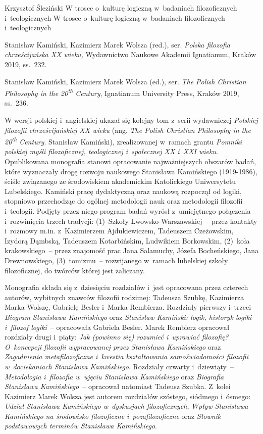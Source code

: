 \begin{recplenv}{Krzysztof Śleziński}
	{W trosce o~kulturę logiczną w~badaniach filozoficznych i~teologicznych}
	{W trosce o~kulturę logiczną w~badaniach filozoficznych\\i~teologicznych}
	{Stanisław Kamiński, Kazimierz Marek Wolsza (red.), ser. \textit{Polska filozofia chrześcijańska XX wieku,}
		Wydawnictwo Naukowe Akademii Ignatianum, Kraków 2019, ss.~232.
		
		Stanisław Kamiński, Kazimierz Marek Wolsza (ed.), ser. \textit{The Polish Christian Philosophy in the
			20\textsuperscript{th} Century}, Ignatianum University Press, Kraków 2019, ss.~236.}







W wersji polskiej i~angielskiej ukazał się kolejny tom z~serii wydawniczej \textit{Polskiej filozofii chrześcijańskiej
XX wieku} (ang. \textit{The Polish Christian Philosophy in the 20\textsuperscript{th} Century}.
Stanisław Kamiński), zrealizowanej w~ramach grantu \textit{Pomniki polskiej myśli filozoficznej,
teologicznej i~społecznej XX i~XXI wieku}. Opublikowana monografia stanowi opracowanie najważniejszych obszarów badań, które
wyznaczały drogę rozwoju naukowego Stanisława Kamińskiego (1919-1986), ściśle związanego ze środowiskiem akademickim
Katolickiego Uniwersytetu Lubelskiego. Kamiński pracę dydaktyczną oraz naukową rozpoczął od logiki, stopniowo
przechodząc do ogólnej metodologii nauk oraz metodologii filozofii i~teologii. Podjęty przez niego program badań wyrósł
z~umiejętnego połączenia i~rozwinięcia trzech tradycji: (1)~Szkoły Lwowsko-Warszawskiej~-- przez kontakty i~rozmowy
m.in. z~Kazimierzem Ajdukiewiczem, Tadeuszem Czeżowskim, Izydorą Dąmbską, Tadeuszem Kotarbińskim, Ludwikiem Borkowskim,
(2)~koła krakowskiego~-- przez znajomość prac Jana Salamuchy, Józefa Bocheńskiego, Jana Drewnowskiego,
(3)~tomizmu~-- rozwijanego w~ramach lubelskiej szkoły filozoficznej, do twórców której jest zaliczany.

Monografia składa się z~dziesięciu rozdziałów i~jest opracowana przez czterech autorów, wybitnych znawców filozofii
rodzimej: Tadeusza Szubkę, Kazimierza Marka Wolszę, Gabrielę Besler i~Marka Rembierza. Rozdziały
pierwszy i~trzeci~-- \textit{Biogram Stanisława Kamińskiego} oraz \textit{Stanisław Kamiński: logik,
historyk logiki i~filozof  logiki}~-- opracowała Gabriela Besler.
Marek Rembierz opracował rozdziały drugi i~piąty:  \textit{Jak (powinno się)
rozumieć i~uprawiać filozofię? O~koncepcji filozofii }\textit{wypracowanej przez Stanisława Kamińskiego} oraz \textit{Zagadnienia
metafilozoficzne i~kwestia kształtowania samoświadomości filozofii w~dociekaniach Stanisława Kamińskiego}. Rozdziały
czwarty i~dziewiąty~-- \textit{Metodologia i~filozofia w~ujęciu Stanisława Kamińskiego} oraz  \textit{Biografia
Stanisława Kamińskiego}~-- opracował natomiast Tadeusz Szubka. Z~kolei Kazimierz Marek Wolsza jest autorem rozdziałów
szóstego, siódmego i~ósmego: \textit{Udział Stanisława Kamińskiego w~dyskusjach filozoficznych}, \textit{Wpływ
Stanisława Kamińskiego na środowisko filozoficzne i~pozafilozoficzne} oraz \textit{Słownik podstawowych terminów
Stanisława Kamińskiego}. 


\end{recplenv}

